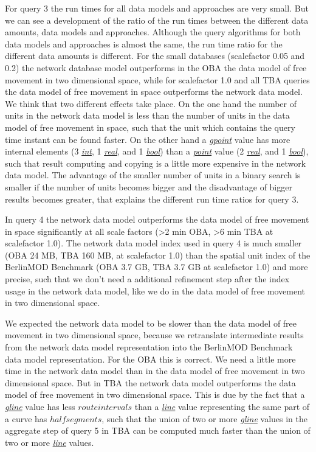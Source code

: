 \documentclass[a4paper]{article}
\newcommand{\bmodb} {BerlinMOD Benchmark}
\newcommand{\dt}[1]{\textsl{\underline{#1}}}
\begin{document}
{For query 3 the run times for all data models and approaches are very small. But
we can see a development of the ratio of the run times between the different
data amounts, data models and approaches. Although the query algorithms for both
data models and approaches is almost the same, the run time ratio for the different
data amounts is different. For the small databases (scalefactor 0.05 and 0.2)
the network database model outperforms in the OBA the data model of free movement
in two dimensional space, while for scalefactor 1.0 and all TBA queries the data
model of free movement in space outperforms the network data model. We think that
two different effects take place. On the one hand the number of units in the network
data model is less than the number of units in the data model of free movement in space,
such that the unit which contains the query time instant can be found faster.
On the other hand a \dt{gpoint} value has more internal elements (3 \dt{int}, 1 \dt{real},
and 1 \dt{bool}) than a \dt{point} value (2 \dt{real}, and 1 \dt{bool}), such
that result computing and copying is a little more expensive in the network data model.
The advantage of the smaller number of units in a binary search is smaller if
the number of units becomes bigger and the disadvantage of bigger results becomes
greater, that explains the different run time ratios for query 3.

In query 4 the network data model outperforms the data model of free movement in space
significantly at all scale factors (>2 min OBA, >6 min TBA at scalefactor 1.0).
The network data model index used in query 4
is much smaller (OBA 24 MB, TBA 160 MB, at scalefactor 1.0) than the
spatial unit index of the \bmodb{} (OBA 3.7 GB, TBA 3.7 GB at scalefactor 1.0)
and more precise, such that we don't need a additional refinement step after the
index usage in the network data model, like we do in the data model of free movement
in two dimensional space.

We expected the network data model to be slower than the data model of free
movement in two dimensional space, because we retranslate intermediate results
from the network data model representation into the \bmodb{} data model representation.
For the OBA this is correct. We need a little more time in the network data model
than in the data model of free movement in two dimensional space. But in TBA the
network data model outperforms the data model of free movement in two dimensional
space. This is due by the fact that a \dt{gline} value has less $route intervals$
than a \dt{line} value representing the same part of a curve has $half segments$,
such that the union of two or more \dt{gline} values in the aggregate step of query 5 in
TBA can be computed much faster than the union of two or more \dt{line} values.

}
\end{document}
